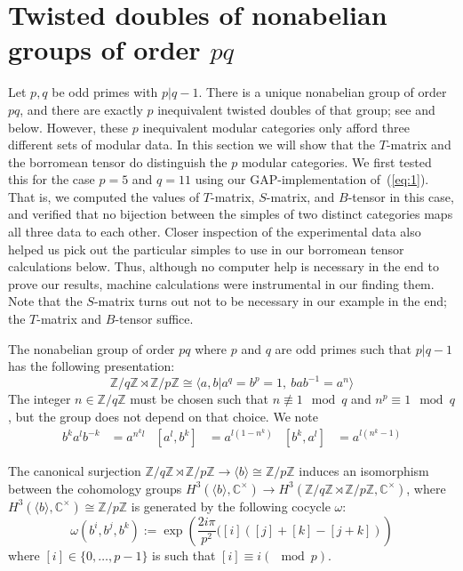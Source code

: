 \documentclass[a4paper, 10pt]{book}
\theoremstyle{definition}
\numberwithin{equation}{chapter}
\newcommand\CC{\mathbb C}
\newcommand\ZZ{\mathbb Z}
\newcommand\CCu{\CC^\times}
\newcommand\semdir{\rtimes}
\begin{document}
\section{Twisted doubles of nonabelian groups of order $pq$}\label{sec:Example}
Let $p,q$ be odd primes with $p|q-1$. There is a unique nonabelian group of order $pq$, and there are exactly $p$ inequivalent twisted doubles of that group; see \cite{2017arXiv170802796M} and below. However, these $p$ inequivalent modular categories only afford three different sets of modular data. In this section we will show that the $T$-matrix and the borromean tensor do distinguish the $p$ modular categories. We first tested this for the case $p=5$ and $q=11$ using our GAP-implementation of~(\cref{eq:1}). That is, we computed the values of $T$-matrix, $S$-matrix, and $B$-tensor in this case, and verified that no bijection between the simples of two distinct categories maps all three data to each other. Closer inspection of the experimental data also helped us pick out the particular simples to use in our borromean tensor calculations below. Thus, although no computer help is necessary in the end to prove our results, machine calculations were instrumental in  our finding them. Note that the $S$-matrix turns out not to be necessary in our example in the end; the $T$-matrix and $B$-tensor suffice.



The nonabelian group of order $pq$ where $p$ and $q$ are odd primes such that $p | q-1$ has the following presentation:
$$
\ZZ/q\ZZ \semdir \ZZ/p\ZZ \cong \langle a,b | a^q=b^p=1 ,\ bab^{-1}=a^n \rangle
$$
The integer $n \in \ZZ/q\ZZ$ must be chosen such that $n \not\equiv 1 \mod q$ and $n^p \equiv 1 \mod q$, but the group does not depend on that choice.
We note
\begin{align}\label{eq:pqformulas}
  b^k a^l b^{-k} &= a^{n^k l} &
  [a^l,b^k]&=a^{l(1-n^k)}&
  [b^k,a^l]&=a^{l(n^k-1)}
\end{align}


The canonical surjection $\ZZ/q\ZZ \semdir \ZZ/p\ZZ\to \langle b\rangle\cong\ZZ/p\ZZ$ induces an isomorphism between the cohomology groups $H^3(\langle b\rangle ,\CCu)\to H^3(\ZZ/q\ZZ \semdir \ZZ/p\ZZ,\CCu)$, where $H^3(\langle b\rangle ,\CCu)\cong \ZZ/p\ZZ$ is generated by the following cocycle $\omega$:
$$
\omega(b^i,b^j,b^k):=\exp\left( \frac{2i\pi}{p^2}([i]([j]+[k]-[j+k])\right)
$$
where $[i]\in\{0,\dots,p-1\}$ is such that $[i]\equiv i(\mod p)$.
\end{document}
